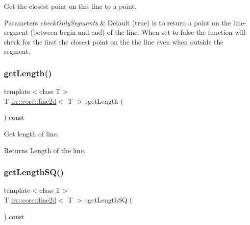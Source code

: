 Get the closest point on this line to a point. 


\begin{DoxyParams}{Parameters}
{\em check\+Only\+Segments} & Default (true) is to return a point on the line-\/segment (between begin and end) of the line. When set to false the function will check for the first the closest point on the the line even when outside the segment. \\
\hline
\end{DoxyParams}
\mbox{\label{classirr_1_1core_1_1line2d_a7322cb613e5e076ce6ff258e0f67dc0a}} 
\subsubsection{\texorpdfstring{get\+Length()}{getLength()}}
{\footnotesize\ttfamily template$<$class T$>$ \\
T \hyperlink{classirr_1_1core_1_1line2d}{irr\+::core\+::line2d}$<$ T $>$\+::get\+Length (\begin{DoxyParamCaption}{ }\end{DoxyParamCaption}) const\hspace{0.3cm}{\ttfamily [inline]}}



Get length of line. 

\begin{DoxyReturn}{Returns}
Length of the line. 
\end{DoxyReturn}
\mbox{\label{classirr_1_1core_1_1line2d_ab2e1b51af84b3f134a32ebb0b7e6968f}} 
\subsubsection{\texorpdfstring{get\+Length\+S\+Q()}{getLengthSQ()}}
{\footnotesize\ttfamily template$<$class T$>$ \\
T \hyperlink{classirr_1_1core_1_1line2d}{irr\+::core\+::line2d}$<$ T $>$\+::get\+Length\+SQ (\begin{DoxyParamCaption}{ }\end{DoxyParamCaption}) const\hspace{0.3cm}{\ttfamily [inline]}}



